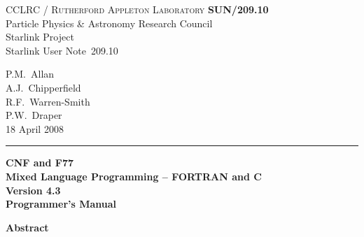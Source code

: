 \documentclass[twoside,11pt]{article}
\newcommand{\stardoccategory}  {Starlink User Note}
\newcommand{\stardocinitials}  {SUN}
\newcommand{\stardocnumber}    {209.10}
\newcommand{\stardocauthors}   {P.M.\ Allan\\
                                A.J.\ Chipperfield\\
                                R.F.\ Warren-Smith\\
                                P.W.\ Draper}
\newcommand{\stardocdate}      {18 April 2008}
\newcommand{\stardoctitle}     {CNF and F77 \\ [1ex]
                                Mixed Language Programming -- FORTRAN and C}
\newcommand{\stardocversion}   {Version 4.3}
\newcommand{\stardocmanual}    {Programmer's Manual}
\newcommand{\stardocname}{\stardocinitials /\stardocnumber}
\newenvironment{latexonly}{}{}
\renewcommand{\_}{\texttt{\symbol{95}}}
\begin{document}
\thispagestyle{empty}

\begin{latexonly}
   CCLRC / \textsc{Rutherford Appleton Laboratory} \hfill \textbf{\stardocname}\\
   {\large Particle Physics \& Astronomy Research Council}\\
   {\large Starlink Project\\}
   {\large \stardoccategory\ \stardocnumber}
   \begin{flushright}
   \stardocauthors\\
   \stardocdate
   \end{flushright}
   \vspace{-4mm}
   \rule{\textwidth}{0.5mm}
   \vspace{5mm}
   \begin{center}
   {\Huge\textbf{\stardoctitle \\ [2.5ex]}}
   {\LARGE\textbf{\stardocversion \\ [4ex]}}
   {\Huge\textbf{\stardocmanual}}
   \end{center}
   \vspace{5mm}


   \vspace{10mm}
   \begin{center}
      {\Large\textbf{Abstract}}
   \end{center}
\end{latexonly}
\end{document}
